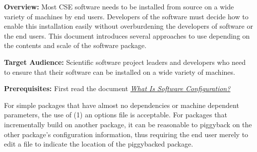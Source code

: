 \documentclass[]{article}
\date{}
\begin{document}
\pagestyle{fancy}
\renewcommand{\headrulewidth}{0pt}
  
\thispagestyle{empty}
\textbf{\newline}
\textbf{\newline}
\textbf{\newline}

\textbf{Overview:} Most CSE software needs to be installed from source
on a wide variety of machines by end users. Developers of the software
must decide how to enable this installation easily without overburdening
the developers of software or the end users. This document introduces
several approaches to use depending on the contents and scale of the
software package.

\textbf{Target Audience:} Scientific software project leaders and
developers who need to ensure that their software can be installed on a
wide variety of machines.

\textbf{Prerequisites:} First read the document
\href{http://ideas-productivity.org/wordpress/wp-content/uploads/2016/02/IDEAS-WhatIsSoftwareConfiguration-V0.1.pdf}{\emph{What
Is Software Configuration?}}

For simple packages that have almost no dependencies or machine
dependent parameters, the use of (1) an options file is acceptable. For
packages that incrementally build on another package, it can be
reasonable to piggyback on the other package's configuration
information, thus requiring the end user merely to edit a file to
indicate the location of the piggybacked package.
\end{document}
